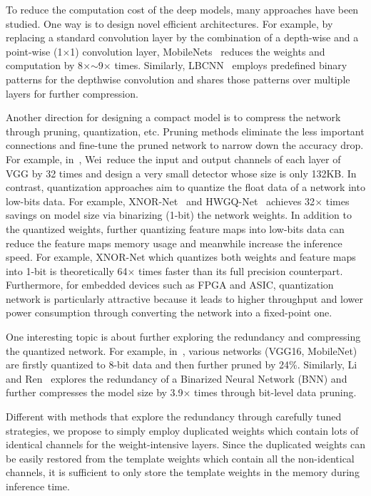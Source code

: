 \documentclass[10pt,twocolumn,letterpaper]{article}
\begin{document}
To reduce the computation cost of the deep models, many  approaches have been studied. One way is to design novel efficient architectures. For example, by replacing a standard convolution layer by the combination of a depth-wise and a point-wise (1$\times$1) convolution layer, MobileNets~\cite{MobileNetv1} reduces the weights and computation by 8$\times$$\sim$9$\times$ times. Similarly, LBCNN~\cite{LBCNN} employs predefined binary patterns for the depthwise convolution and shares those patterns over multiple layers for further compression.

Another direction for designing a compact model is to compress the network through pruning, quantization, etc. Pruning methods eliminate the less important connections and fine-tune the pruned network to narrow down the accuracy drop. For example, in~\cite{QunatMimic}, Wei~\etal reduce the input and output channels of each layer of VGG by 32 times and design a  very small detector whose size is only 132KB. In contrast, quantization approaches aim to quantize the float data of a network into low-bits data. For example, XNOR-Net~\cite{XNOR} and HWGQ-Net~\cite{HWGQ} achieves 32$\times$ times savings on model size via binarizing (1-bit) the network weights. In addition to the quantized weights,  further quantizing feature maps into low-bits data can reduce the feature maps memory usage and meanwhile increase the inference speed. For example, XNOR-Net which quantizes both weights and feature maps into 1-bit is theoretically 64$\times$ times faster than its full precision counterpart. Furthermore, for embedded devices such as FPGA and ASIC, quantization network is particularly attractive because it leads to higher throughput and lower power consumption through converting the network into a fixed-point one.  

One interesting topic is about further exploring the redundancy and  compressing the quantized network. For example, in~\cite{ToCompress}, various networks (VGG16, MobileNet) are firstly quantized to 8-bit data and then further pruned by 24\%. Similarly, Li and Ren~\cite{BNNPrune} explores the redundancy of a Binarized Neural Network (BNN) and further compresses the model size by 3.9$\times$ times through bit-level data pruning. 

Different with methods that explore the redundancy through carefully tuned strategies, we propose to simply employ duplicated weights which contain lots of identical channels for the weight-intensive layers. Since the duplicated weights can be easily restored from the template weights which contain all the non-identical channels, it is sufficient to only store the template weights in the memory during inference time.
\end{document}
